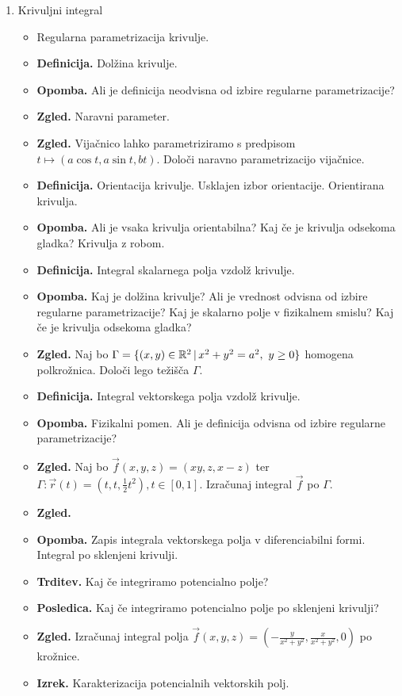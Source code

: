 \begin{enumerate}
    \item Krivuljni integral
    \begin{itemize}
        \item Regularna parametrizacija krivulje.
        \item \textbf{Definicija.} Dolžina krivulje.
        \item \textbf{Opomba.} Ali je definicija neodvisna od izbire regularne parametrizacije? 
        \item \textbf{Zgled.} Naravni parameter.
        \item \textbf{Zgled.} Vijačnico lahko parametriziramo s predpisom \(t \mapsto (a\cos t, a \sin t, bt)\). Določi naravno parametrizacijo vijačnice.
        \newpage
        \item \textbf{Definicija.} Orientacija krivulje. Usklajen izbor orientacije. Orientirana krivulja.
        \item \textbf{Opomba.} Ali je vsaka krivulja orientabilna? Kaj če je krivulja odsekoma gladka? Krivulja z robom.
        \item \textbf{Definicija.} Integral skalarnega polja vzdolž krivulje.
        \item \textbf{Opomba.} Kaj je dolžina krivulje? Ali je vrednost odvisna od izbire regularne parametrizacije? Kaj je skalarno polje v fizikalnem smislu? Kaj če je krivulja odsekoma gladka?
        \item \textbf{Zgled.} Naj bo \(\Gamma = \{(x,y) \in \mathbb{R}^2 \,|\, x^2+y^2 = a^2, \ y \geq 0\}\) homogena polkrožnica. Določi lego težišča \(\Gamma\).
        \item \textbf{Definicija.} Integral vektorskega polja vzdolž krivulje.
        \item \textbf{Opomba.} Fizikalni pomen. Ali je definicija odvisna od izbire regularne parametrizacije?
        \item \textbf{Zgled.} Naj bo \(\vec{f}(x,y,z) = (xy, z, x- z)\) ter \(\Gamma: \vec{r}(t) = (t, t, \frac{1}{2}t^2), t \in [0,1]\). Izračunaj integral \(\vec{f}\) po \(\Gamma\).
        \item \textbf{Zgled.} 
        \item \textbf{Opomba.} Zapis integrala vektorskega polja v diferenciabilni formi. Integral po sklenjeni krivulji. 
        \item \textbf{Trditev.} Kaj če integriramo potencialno polje?
        \item \textbf{Posledica.} Kaj če integriramo potencialno polje po sklenjeni krivulji?
        \item \textbf{Zgled.} Izračunaj integral polja \(\vec{f}(x,y,z) = \left(-\frac{y}{x^2 + y^2}, \frac{x}{x^2+y^2}, 0\right)\) po krožnice.
        \item \textbf{Izrek.} Karakterizacija potencialnih vektorskih polj.
    \end{itemize}
\end{enumerate}